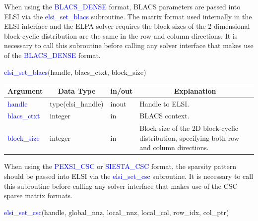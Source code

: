 \documentclass{report}
\newcommand{\tcb}[1]{\textcolor{blue}{#1}}
\begin{document}
When using the \tcb{BLACS\_DENSE} format, BLACS parameters are passed into ELSI via the \tcb{elsi\_set\_blacs} subroutine. The matrix format used internally in the ELSI interface and the ELPA solver requires the block sizes of the 2-dimensional block-cyclic distribution are the same in the row and column directions. It is necessary to call this subroutine before calling any solver interface that makes use of the \tcb{BLACS\_DENSE} format.
\begin{labeling}{\hspace{6cm}}
\item [\hspace{0.3cm} \tcb{elsi\_set\_blacs}(handle, blacs\_ctxt, block\_size)]
\end{labeling}

\begin{tabular}[]{|p{30mm}|p{30mm}|p{15mm}|p{90mm}|}
\hline
\multicolumn{1}{|c|}{\textbf{Argument}} & \multicolumn{1}{c|}{\textbf{Data Type}} & \multicolumn{1}{c|}{\textbf{in/out}} & \multicolumn{1}{c|}{\textbf{Explanation}}\\
\hline
\tcb{handle}      & type(elsi\_handle) & inout & Handle to ELSI.\\
\hline
\tcb{blacs\_ctxt} & integer            & in    & BLACS context.\\
\hline
\tcb{block\_size} & integer            & in    & Block size of the 2D block-cyclic distribution, specifying both row and column directions.\\
\hline
\end{tabular}

When using the \tcb{PEXSI\_CSC} or \tcb{SIESTA\_CSC} format, the sparsity pattern should be passed into ELSI via the \tcb{elsi\_set\_csc} subroutine. It is necessary to call this subroutine before calling any solver interface that makes use of the CSC sparse matrix formats.
\begin{labeling}{\hspace{6cm}}
\item [\hspace{0.3cm} \tcb{elsi\_set\_csc}(handle, global\_nnz, local\_nnz, local\_col, row\_idx, col\_ptr)]
\end{labeling}
\end{document}
